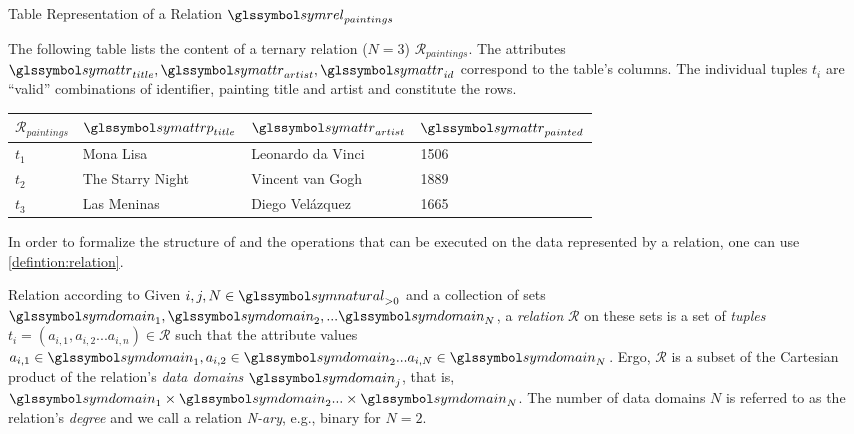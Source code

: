 \begin{example}[label=example:relational_table]{Table Representation of a Relation $\symrel_{paintings}$}{}
    
    The following table lists the content of a ternary relation ($N = 3$) $\mathcal{R}_{paintings}$. The attributes $\symattr_{title}, \symattr_{artist}, \symattr_{id}$ correspond to the table's columns. The individual tuples $t_i$ are ``valid'' combinations of identifier, painting title and artist and constitute the rows.
        
    \begin{center}
        \begin{tabular}{ l || l | l | l |}
            $\mathcal{R}_{paintings}$ & $\symattrp_{title}$  & $\symattr_{artist}$  & $\symattr_{painted}$ \\ 
            \hline
            \hline
            $t_1$ & Mona Lisa &  Leonardo da Vinci & 1506 \\
            \hline
            $t_2$ & The Starry Night & Vincent van Gogh & 1889 \\
            \hline
            $t_3$ & Las Meninas & Diego Velázquez & 1665 \\
            \hline
        \end{tabular}
    \end{center}
\end{example}

In order to formalize the structure of and the operations that can be executed on the data represented by a relation, one can use \cref{defintion:relation}. 

\begin{definition}[label=defintion:relation]{Relation according to \cite{Codd:1970Relational}}{}
    Given $i,j,N \in \symnatural_{> 0}$ and a collection of sets $\symdomain_1, \symdomain_2, ... \symdomain_N$, a \emph{relation} $\mathcal{R}$ on these sets is a set of \emph{tuples} $t_i = (a_{i,1}, a_{i,2} ... a_{i,n}) \in \mathcal{R}$ such that the attribute values $a_{i,1} \in \symdomain_1, a_{i,2} \in \symdomain_2 ... a_{i,N} \in \symdomain_N$. Ergo, $\mathcal{R}$ is a subset of the Cartesian product of the relation's \emph{data domains} $\symdomain_j$, that is, $\symdomain_1 \times \symdomain_2 ... \times \symdomain_N$. The number of data domains $N$ is referred to as the relation's \emph{degree} and we call a relation \emph{N-ary}, e.g., binary for $N=2$. 
\end{definition}


